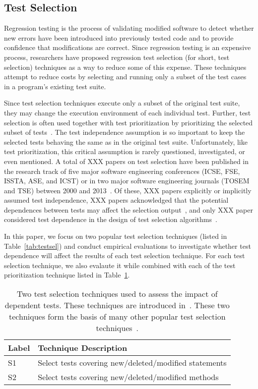 \subsection{Test Selection}

Regression testing is the process of validating modified
software to detect whether new errors
have been introduced into previously tested code and
to provide confidence that modifications
are correct. Since regression testing is an expensive process,
researchers have proposed regression test selection (for short,
test selection) techniques as a way to reduce some of this expense.
These techniques attempt to reduce costs by selecting and running
only a subset of the test cases in a program's existing test suite.


Since test selection techniques execute only a subset of the original
test suite, they may change the execution environment
of each individual test. 
Further, test selection is often used together with
test prioritization by prioritizing the selected
subset of tests~\cite{}. The test independence assumption
is so important to keep the selected tests behaving the
same as in the original test suite. Unfortunately,
like test prioritization, this critical assumption is
rarely questioned, investigated, or even mentioned.
A total of XXX papers on test selection have been  
published in the research track of five major software
engineering conferences
(ICSE, FSE, ISSTA, ASE, and ICST) or in two major
software engineering journals
(TOSEM and TSE) between 2000 and 2013~\cite{alltestprior}.
Of these,
XXX papers explicitly or implicitly assumed test independence,
XXX papers acknowledged that the potential dependences between tests
may affect the selection output~\cite{},
and only XXX paper considered test dependence in the design of
test selection algorithms~\cite{}.


In this paper, we focus on two popular test selection techniques (listed
in Table~\ref{tab:testsel}) and conduct empirical evaluations
to investigate whether test dependence will affect the results of
each test selection technique. For each test selection technique,
we also evalaute it while combined with each of the test
prioritization technique listed in Table~\ref{tab:testprio}.

\begin{table}
\centering
\setlength{\tabcolsep}{0.25\tabcolsep}
\begin{tabular}{|l|l|}
\hline
\textbf{Label} & \textbf{Technique Description} \\
\hline
S1 & Select tests covering new/deleted/modified statements\\
S2 & Select tests covering new/deleted/modified methods\\
\hline
\end{tabular}
\caption{Two test selection techniques used
to assess the impact of dependent tests. These
techniques are introduced in~\cite{}. These
two techniques form the basis of many other
popular test selection techniques~\cite{}.
}
\label{tab:testprio}
\end{table}



